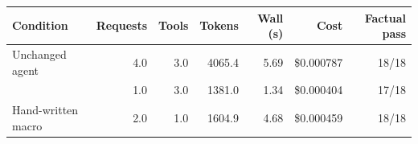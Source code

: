 \begin{tabular}{lrrrrrr}
\toprule
Condition & Requests & Tools & Tokens & Wall (s) & Cost & Factual pass \\
\midrule
Unchanged agent & 4.0 & 3.0 & 4065.4 & 5.69 & \$0.000787 & 18/18 \\
\method{} & 1.0 & 3.0 & 1381.0 & 1.34 & \$0.000404 & 17/18 \\
Hand-written macro & 2.0 & 1.0 & 1604.9 & 4.68 & \$0.000459 & 18/18 \\
\bottomrule
\end{tabular}
